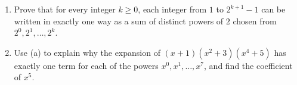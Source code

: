 \begin{enumerate}
\item[(a)] Prove that for every integer $k\ge0$, each integer from $1$ to $2^{k+1}-1$ can be written in exactly one way as a sum of distinct powers of $2$ chosen from $2^0,2^1,\dots,2^k$.
\item[(b)] Use (a) to explain why the expansion of $(x+1)\left(x^2+3\right)\left(x^4+5\right)$ has exactly one term for each of the powers $x^0,x^1,\dots,x^7$, and find the coefficient of $x^5$.
\end{enumerate}

